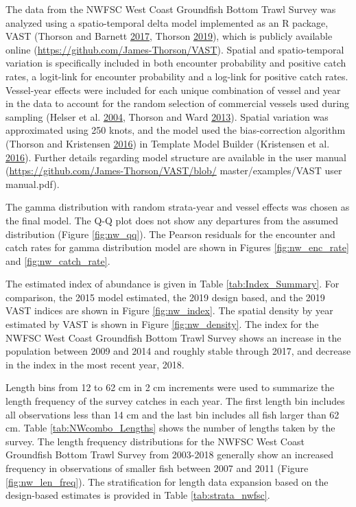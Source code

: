 \documentclass[12pt,]{article}
\begin{document}
The data from the NWFSC West Coast Groundfish Bottom Trawl Survey was
analyzed using a spatio-temporal delta model implemented as an R
package, VAST (Thorson and Barnett
\protect\hyperlink{ref-thorson_comparing_2017}{2017}, Thorson
\protect\hyperlink{ref-thorson_guidance_2019}{2019}), which is publicly
available online (\url{https://github.com/James-Thorson/VAST}). Spatial
and spatio-temporal variation is specifically included in both encounter
probability and positive catch rates, a logit-link for encounter
probability and a log-link for positive catch rates. Vessel-year effects
were included for each unique combination of vessel and year in the data
to account for the random selection of commercial vessels used during
sampling (Helser et al.
\protect\hyperlink{ref-helser_generalized_2004}{2004}, Thorson and Ward
\protect\hyperlink{ref-thorson_accounting_2013}{2013}). Spatial
variation was approximated using 250 knots, and the model used the
bias-correction algorithm (Thorson and Kristensen
\protect\hyperlink{ref-thorson_implementing_2016}{2016}) in Template
Model Builder (Kristensen et al.
\protect\hyperlink{ref-kristensen_tmb:_2016}{2016}). Further details
regarding model structure are available in the user manual
(\url{https://github.com/James-Thorson/VAST/blob/} master/examples/VAST
user manual.pdf).

The gamma distribution with random strata-year and vessel effects was
chosen as the final model. The Q-Q plot does not show any departures
from the assumed distribution (Figure \ref{fig:nw_qq}). The Pearson
residuals for the encounter and catch rates for gamma distribution model
are shown in Figures \ref{fig:nw_enc_rate} and \ref{fig:nw_catch_rate}.

The estimated index of abundance is given in Table
\ref{tab:Index_Summary}. For comparison, the 2015 model estimated, the
2019 design based, and the 2019 VAST indices are shown in Figure
\ref{fig:nw_index}. The spatial density by year estimated by VAST is
shown in Figure \ref{fig:nw_density}. The index for the NWFSC West Coast
Groundfish Bottom Trawl Survey shows an increase in the population
between 2009 and 2014 and roughly stable through 2017, and decrease in
the index in the most recent year, 2018.

Length bins from 12 to 62 cm in 2 cm increments were used to summarize
the length frequency of the survey catches in each year. The first
length bin includes all observations less than 14 cm and the last bin
includes all fish larger than 62 cm. Table \ref{tab:NWcombo_Lengths}
shows the number of lengths taken by the survey. The length frequency
distributions for the NWFSC West Coast Groundfish Bottom Trawl Survey
from 2003-2018 generally show an increased frequency in observations of
smaller fish between 2007 and 2011 (Figure \ref{fig:nw_len_freq}). The
stratification for length data expansion based on the design-based
estimates is provided in Table \ref{tab:strata_nwfsc}.
\end{document}
